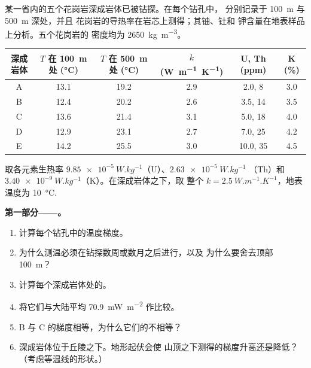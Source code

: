 \begin{problem}
\label{pb:b1:heat-budget:1}
某一省内的五个花岗岩深成岩体已被钻探。在每个钻孔中，
分别记录于 \qty{100}{m} 与 \qty{500}{m} 深处，并且
花岗岩的导热率在岩芯上测得；其铀、钍和
钾含量在地表样品上分析。五个花岗岩的
密度均为 \qty{2650}{kg.m^{-3}}。
\begin{center}
\small
\begin{tabular}{cccccc}
\hline
深成岩体 & $T$ 在 \qty{100}{m} 处 (\unit{\degreeCelsius}) & $T$ 在 \qty{500}{m} 处 (\unit{\degreeCelsius}) & $k$ (\unit{W.m^{-1}.K^{-1}}) & U, Th (ppm) & K (\unit{\percent}) \\
\hline
A & 13.1 & 19.2 & 2.9 & 2.0, 8 & 3.0 \\
B & 12.4 & 20.2 & 2.6 & 3.5, 14 & 3.5 \\
C & 13.6 & 21.4 & 3.1 & 5.0, 18 & 4.0 \\
D & 12.9 & 23.1 & 2.7 & 7.0, 25 & 4.2 \\
E & 14.2 & 25.5 & 3.0 & 10.0, 35 & 4.5 \\
\hline
\end{tabular}
\end{center}
取各元素生热率 $\qty{9.85e-5}{W.kg^{-1}}$（U）、$\qty{2.63e-5}{W.kg^{-1}}$
（Th）和 $\qty{3.40e-9}{W.kg^{-1}}$（K）。在深成岩体之下，取
整个 $k = \qty{2.5}{W.m^{-1}.K^{-1}}$，地表温度为
\qty{10}{\degreeCelsius}.

\medskip
\noindent\textbf{第一部分——。}
\begin{enumerate}
  \item 计算每个钻孔中的温度梯度。
  \item 为什么测温必须在钻探数周或数月之后进行，以及
        为什么要舍去顶部 \qty{100}{m}？
  \item 计算每个深成岩体处的。
  \item 将它们与大陆平均 \qty{70.9}{mW.m^{-2}} 作比较。
  \item B 与 C 的梯度相等，为什么它们的不相等？
  \item 深成岩体位于丘陵之下。地形起伏会使
        山顶之下测得的梯度升高还是降低？（考虑等温线的形状。）
\end{enumerate}


\end{problem}
